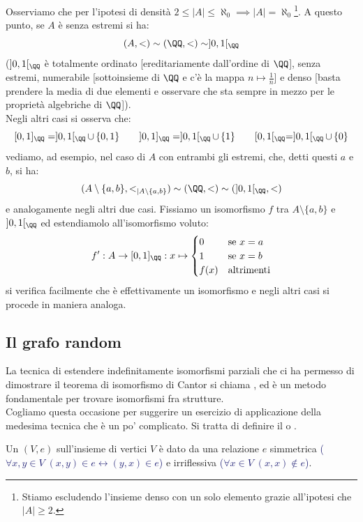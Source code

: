 \begin{soln}
	Osserviamo che per l'ipotesi di densità $2 \leq |A| \leq \aleph_0 \implies |A| = \aleph_0$\footnote{Stiamo escludendo l'insieme denso con un solo elemento grazie all'ipotesi che $|A| \geq 2$.}. A questo punto, se $A$ è senza estremi si ha:
	\[ (A,<) \sim (\QQ,<) \sim ]0,1[_\QQ
		\]
	($]0,1[_\QQ$ è totalmente ordinato [ereditariamente dall'ordine di $\QQ$], senza estremi, numerabile [sottoinsieme di $\QQ$ e c'è la mappa $n \mapsto \frac 1n$] e denso [basta prendere la media di due elementi e osservare che sta sempre in mezzo per le proprietà algebriche di $\QQ$]).\\
	Negli altri casi si osserva che:
	\[ [0,1]_{\QQ} = ]0,1[_{\QQ} \,\cup\, \{0,1\}  \qquad ]0,1]_{\QQ} = ]0,1[_{\QQ} \,\cup\, \{1\} \qquad [0,1[_{\QQ} = ]0,1[_{\QQ} \,\cup\, \{0\}
		\]
	vediamo, ad esempio, nel caso di $A$ con entrambi gli estremi, che, detti questi $a$ e $b$, si ha:
	\[ (A\setminus\{a,b\},<_{|A\setminus\{a,b\}}) \sim (\QQ,<) \sim (]0,1[_{\QQ},<)
		\]
	e analogamente negli altri due casi. Fissiamo un isomorfismo $f$ tra $A \setminus \{a,b\}$ e $]0,1[_\QQ$ ed estendiamolo all'isomorfismo voluto:
	\[ f' : A \to [0,1]_\QQ : x \mapsto \begin{cases}
		0 &\text{se $x = a$} \\
		1 &\text{se $x = b$} \\
		f(x) &\text{altrimenti}
	\end{cases}
		\]
	si verifica facilmente che è effettivamente un isomorfismo e negli altri casi si procede in maniera analoga.
\end{soln}

\subsection{Il grafo random}

La tecnica di estendere indefinitamente isomorfismi parziali che ci ha permesso di dimostrare il teorema di isomorfismo di Cantor
si chiama , ed è un metodo fondamentale per trovare isomorfismi fra strutture.\\
Cogliamo questa occasione per suggerire un esercizio di applicazione della medesima tecnica che è un po' complicato. Si tratta di definire il 
o .

\begin{definition}[Grafo]
	Un  $(V,e)$ sull'insieme di vertici $V$ è dato da una relazione $e$ simmetrica \textcolor{MidnightBlue}{($\forall x,y \in V \; (x,y) \in e \leftrightarrow (y,x) \in e$)} e 
	irriflessiva \textcolor{MidnightBlue}{($\forall x \in V \; (x,x) \not\in e$)}.
\end{definition}

